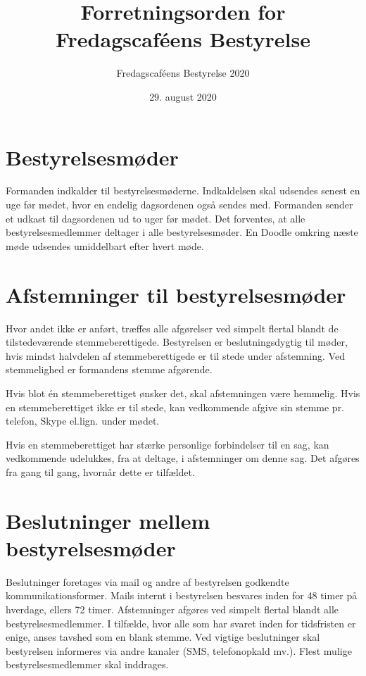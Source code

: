 

\title{Forretningsorden for Fredagscaféens Bestyrelse}
\author{Fredagscaféens Bestyrelse 2020}
\date{29. august 2020}

\renewcommand{\thesection}{§\arabic{section}}



\maketitle

\section{Bestyrelsesmøder}
Formanden indkalder til bestyrelsesmøderne. Indkaldelsen skal udsendes senest en uge før mødet, hvor en endelig dagsordenen også sendes med. Formanden sender et udkast til dagsordenen ud to uger før mødet. Det forventes, at alle bestyrelsesmedlemmer deltager i alle bestyrelsesmøder. En Doodle omkring næste møde udsendes umiddelbart efter hvert møde.

\section{Afstemninger til bestyrelsesmøder}
Hvor andet ikke er anført, træffes alle afgørelser ved simpelt flertal blandt de tilstedeværende stemmeberettigede. Bestyrelsen er beslutningsdygtig til møder, hvis mindst halvdelen af stemmeberettigede er til stede under afstemning. Ved stemmelighed er formandens stemme afgørende.

Hvis blot én stemmeberettiget ønsker det, skal afstemningen være hemmelig. Hvis en stemmeberettiget ikke er til stede, kan vedkommende afgive sin stemme pr. telefon, Skype el.lign. under mødet.

Hvis en stemmeberettiget har stærke personlige forbindelser til en sag, kan vedkommende udelukkes, fra at deltage, i afstemninger om denne sag. Det afgøres fra gang til gang, hvornår dette er tilfældet.

\section{Beslutninger mellem bestyrelsesmøder}
Beslutninger foretages via mail og andre af bestyrelsen godkendte kommunikationsformer. Mails internt i bestyrelsen besvares inden for 48 timer på hverdage, ellers 72 timer. Afstemninger afgøres ved simpelt flertal blandt alle bestyrelsesmedlemmer. I tilfælde, hvor alle som har svaret inden for tidsfristen er enige, anses tavshed som en blank stemme. Ved vigtige beslutninger skal bestyrelsen informeres via andre kanaler (SMS, telefonopkald mv.). Flest mulige bestyrelsesmedlemmer skal inddrages.

